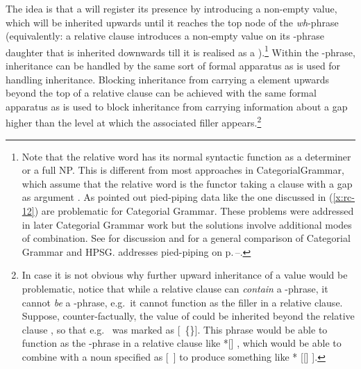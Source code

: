 \documentclass[output=paper,biblatex,babelshorthands,newtxmath,draftmode,colorlinks,citecolor=brown]{langscibook}
\begin{document}
The idea is that a  will register its presence by introducing a non-empty
 value, which will be inherited upwards until it reaches the top node of the \emph{wh}-phrase (equivalently: a relative clause
introduces a non-empty  value on its -phrase daughter that is inherited downwards till it is
realised as a ).\footnote{\label{rc-fn-relative-word-cg}%
  Note that the relative word has its normal syntactic function as a
  determiner or a full NP. This is different from most approaches in Categorial\indexcg Grammar, which
  assume that the relative word is the functor taking a clause 
  with a gap as argument \citep[]{Steedman97a}. As \citet{Pollard88a}
  pointed out pied-piping data like the one discussed in (\ref{x:rc-12})
  are problematic for Categorial Grammar. These problems were addressed in
  later Categorial Grammar work but the solutions involve additional modes of
  combination. See  for discussion and  for
  a general comparison of Categorial Grammar and HPSG. \citeauthor{chapters/cg} addresses pied-piping
  on p.\,\pageref{cg:page-pied-piping-start}--\pageref{cg:page-pied-piping-end}.}
Within the -phrase,  inheritance can
be handled by the same sort of formal apparatus as is used for handling 
inheritance. Blocking  inheritance from carrying a  element
upwards beyond the top of a relative clause can be achieved with the same formal apparatus
as is used to block  inheritance from carrying information about a gap
higher than the level at which the associated filler appears.\footnote{In case it is not
  obvious why further upward inheritance of a  value would be problematic,
  notice that while a relative clause can \emph{contain} a -phrase, it cannot
  \emph{be} a -phrase, e.g.\ it cannot function as the filler in a relative
  clause. Suppose, counter-factually, the  value of  could be inherited
  beyond the relative clause , so that e.g.\  was marked as [~\{\}]. This phrase would be able to
  function as the -phrase in a relative clause like *[] , which would be able to combine with a noun specified as
  [~] to produce something like * [[] ].}
%
\end{document}
